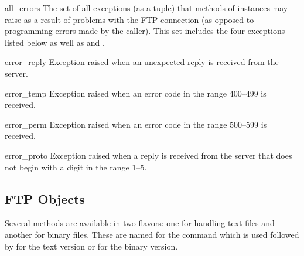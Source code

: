 \begin{datadesc}{all_errors}
The set of all exceptions (as a tuple) that methods of 
instances may raise as a result of problems with the FTP connection
(as opposed to programming errors made by the caller).  This set
includes the four exceptions listed below as well as
 and .
\end{datadesc}

\begin{excdesc}{error_reply}
Exception raised when an unexpected reply is received from the server.
\end{excdesc}

\begin{excdesc}{error_temp}
Exception raised when an error code in the range 400--499 is received.
\end{excdesc}

\begin{excdesc}{error_perm}
Exception raised when an error code in the range 500--599 is received.
\end{excdesc}

\begin{excdesc}{error_proto}
Exception raised when a reply is received from the server that does
not begin with a digit in the range 1--5.
\end{excdesc}


\begin{seealso}
\end{seealso}


\subsection{FTP Objects \label{ftp-objects}}

Several methods are available in two flavors: one for handling text
files and another for binary files.  These are named for the command
which is used followed by  for the text version or
 for the binary version.

